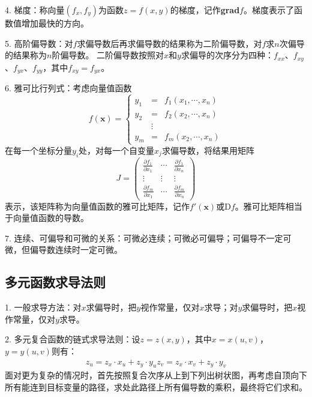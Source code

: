 4. 梯度：称向量$(f_x,f_y)$为函数$z=f(x,y)$的梯度，记作\textbf{grad}$f$。梯度表示了函数值增加最快的方向。

5. 高阶偏导数：对$f$求偏导数后再求偏导数的结果称为二阶偏导数，对$f$求$n$次偏导的结果称为$n$阶偏导数。
二阶偏导数按照对$x$和$y$求偏导的次序分为四种：$f_{xx}$、$f_{xy}$、$f_{yx}$、$f_{yy}$，其中$f_{xy}=f_{yx}$。

6. 雅可比行列式：考虑向量值函数
\begin{equation*}
    f(\mathbf{x})=\left\{
        \begin{aligned}
            y_1 & = & f_1(x_1,\cdots,x_n)\\
            y_2 & = & f_2(x_2,\cdots,x_n)\\
        &\vdots&\\
            y_m & = & f_m(x_2,\cdots,x_n)
        \end{aligned}\right.
\end{equation*}
在每一个坐标分量$y_i$处，对每一个自变量$x_j$求偏导数，将结果用矩阵
\begin{equation*}
    J=\begin{pmatrix}
        \frac{\partial f_1}{\partial x_1} &\cdots&\frac{\partial f_1}{\partial x_n}\\
        \vdots&\vdots&\vdots\\
        \frac{\partial f_m}{\partial x_1} &\cdots&\frac{\partial f_m}{\partial x_n}
    \end{pmatrix}
\end{equation*}
表示，该矩阵称为向量值函数的雅可比矩阵，记作$f'(\mathbf{x})$或$\mathrm{D}f$。雅可比矩阵相当于向量值函数的导数。

7. 连续、可偏导和可微的关系：可微必连续；可微必可偏导；可偏导不一定可微，但偏导数连续时一定可微。

\subsection{多元函数求导法则}

1. 一般求导方法：对$x$求偏导时，把$y$视作常量，仅对$x$求导；对$y$求偏导时，把$x$视作常量，仅对$y$求导。

2. 多元复合函数的链式求导法则：设$z=z(x,y)$，其中$x=x(u,v)$，$y=y(u,v)$则有：
\begin{eqnarray*}
    z_u=z_x\cdot x_u+z_y \cdot y_u
    z_v = z_x \cdot x_v +z_y \cdot y_v
\end{eqnarray*}
面对更为复杂的情况时，首先按照复合次序从上到下列出树状图，再考虑自顶向下所有能连到目标变量的路径，求处此路径上所有偏导数的乘积，最终将它们求和。

